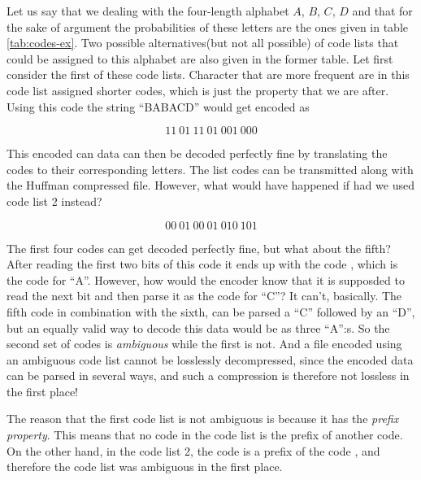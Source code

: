 Let us say that we dealing with the four-length alphabet $A$, $B$,
$C$, $D$ and that for the sake of argument the probabilities of these
letters are the ones given in table \ref{tab:codes-ex}. Two possible
alternatives(but not all possible) of code lists that could be
assigned to this alphabet are also given in the former table. Let
first consider the first of these code lists.  Character that are more
frequent are in this code list assigned shorter codes, which is just
the property that we are after. Using this code the string ``BABACD''
would get encoded as

\begin{equation*}
  11\ 01\ 11\ 01\ 001\ 000
\end{equation*}

This encoded can data can then be decoded perfectly fine by
translating the codes to their corresponding letters. The list codes
can be transmitted along with the Huffman compressed file. However,
what would have happened if had we used code list 2 instead?

\begin{equation*}
  00\ 01\ 00\ 01\ 010\ 101
\end{equation*}

The first four codes can get decoded perfectly fine, but what about
the fifth? After reading the first two bits of this code it ends up
with the code , which is the code for ``A''. However, how
would the encoder know that it is supposded to read the next bit and
then parse it as the code for ``C''? It can't, basically. The fifth
code in combination with the sixth,  can be parsed a ``C''
followed by an ``D'', but an equally valid way to decode this data
would be as three ``A'':s. So the second set of codes is
\textit{ambiguous} while the first is not. And a file encoded using an
ambiguous code list cannot be losslessly decompressed, since the
encoded data can be parsed in several ways, and such a compression is
therefore not lossless in the first place!

The reason that the first code list is not ambiguous is because it has
the \textit{prefix property}. This means that no code in the code list
is the prefix of another code. On the other hand, in the code list 2,
the code  is a prefix of the code , and therefore the
code list was ambiguous in the first place.

